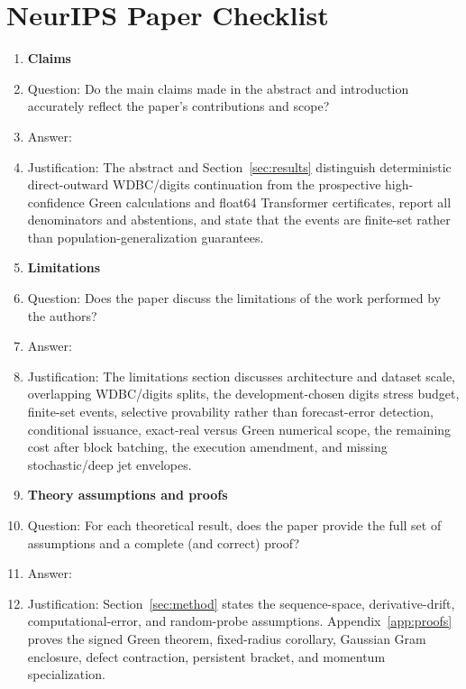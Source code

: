 \section*{NeurIPS Paper Checklist}

\begin{enumerate}

\item {\bf Claims}
    \item[] Question: Do the main claims made in the abstract and introduction accurately reflect the paper's contributions and scope?
    \item[] Answer: \answerYes{}
    \item[] Justification: The abstract and Section~\ref{sec:results} distinguish deterministic direct-outward WDBC/digits continuation from the prospective high-confidence Green calculations and float64 Transformer certificates, report all denominators and abstentions, and state that the events are finite-set rather than population-generalization guarantees.

\item {\bf Limitations}
    \item[] Question: Does the paper discuss the limitations of the work performed by the authors?
    \item[] Answer: \answerYes{}
    \item[] Justification: The limitations section discusses architecture and dataset scale, overlapping WDBC/digits splits, the development-chosen digits stress budget, finite-set events, selective provability rather than forecast-error detection, conditional issuance, exact-real versus Green numerical scope, the remaining cost after block batching, the execution amendment, and missing stochastic/deep jet envelopes.

\item {\bf Theory assumptions and proofs}
    \item[] Question: For each theoretical result, does the paper provide the full set of assumptions and a complete (and correct) proof?
    \item[] Answer: \answerYes{}
    \item[] Justification: Section~\ref{sec:method} states the sequence-space, derivative-drift, computational-error, and random-probe assumptions. Appendix~\ref{app:proofs} proves the signed Green theorem, fixed-radius corollary, Gaussian Gram enclosure, defect contraction, persistent bracket, and momentum specialization.


\end{enumerate}
